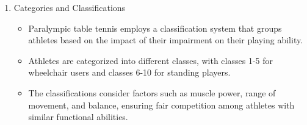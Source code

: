 \begin{enumerate}
\item Categories and Classifications
    \begin{itemize}
    \item Paralympic table tennis employs a classification system that groups athletes based on the impact of their impairment on their playing ability. 
    \item Athletes are categorized into different classes, with classes 1-5 for wheelchair users and classes 6-10 for standing players. 
    \item The classifications consider factors such as muscle power, range of movement, and balance, ensuring fair competition among athletes with similar functional abilities.
    \end{itemize}

\end{enumerate}